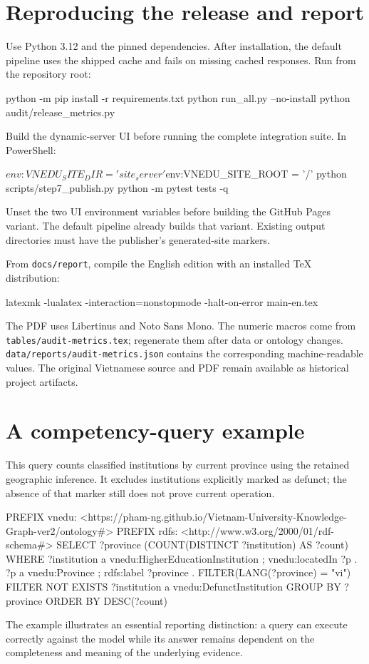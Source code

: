 \documentclass[11pt,a4paper]{article}
\newcommand{\term}[1]{\texttt{#1}}
\begin{document}
\appendix
\section{Reproducing the release and report}
Use Python 3.12 and the pinned dependencies. After installation, the default pipeline
uses the shipped cache and fails on missing cached responses. Run from the repository root:
\begin{code}
python -m pip install -r requirements.txt
python run_all.py --no-install
python audit/release_metrics.py
\end{code}
Build the dynamic-server UI before running the complete integration suite. In PowerShell:
\begin{code}
$env:VNEDU_SITE_DIR = 'site_server'
$env:VNEDU_SITE_ROOT = '/'
python scripts/step7_publish.py
python -m pytest tests -q
\end{code}
Unset the two UI environment variables before building the GitHub Pages variant. The
default pipeline already builds that variant. Existing output directories must have the
publisher's generated-site markers.

From \term{docs/report}, compile the English edition with an installed TeX distribution:
\begin{code}
latexmk -lualatex -interaction=nonstopmode -halt-on-error main-en.tex
\end{code}
The PDF uses Libertinus and Noto Sans Mono. The numeric macros come from
\term{tables/audit-metrics.tex}; regenerate them after data or ontology changes.
\term{data/reports/audit-metrics.json} contains the corresponding machine-readable values.
The original Vietnamese source and PDF remain available as historical project artifacts.

\clearpage
\section{A competency-query example}
This query counts classified institutions by current province using the retained
geographic inference. It excludes institutions explicitly marked as defunct; the absence
of that marker still does not prove current operation.
\begin{code}
PREFIX vnedu: <https://pham-ng.github.io/Vietnam-University-Knowledge-Graph-ver2/ontology#>
PREFIX rdfs: <http://www.w3.org/2000/01/rdf-schema#>
SELECT ?province (COUNT(DISTINCT ?institution) AS ?count)
WHERE {
  ?institution a vnedu:HigherEducationInstitution ;
               vnedu:locatedIn ?p .
  ?p a vnedu:Province ; rdfs:label ?province .
  FILTER(LANG(?province) = "vi")
  FILTER NOT EXISTS { ?institution a vnedu:DefunctInstitution }
}
GROUP BY ?province
ORDER BY DESC(?count)
\end{code}
The example illustrates an essential reporting distinction: a query can execute correctly
against the model while its answer remains dependent on the completeness and meaning of
the underlying evidence.
\end{document}
